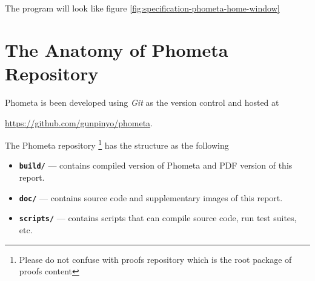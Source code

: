 \documentclass[master.tex]{subfiles}
\begin{document}
The program will look like figure \ref{fig:specification-phometa-home-window}

\section{The Anatomy of Phometa Repository}

Phometa is been developed using \emph{Git} as the version control and hosted
at

\url{https://github.com/gunpinyo/phometa}.

The Phometa repository \footnote{Please do not confuse with proofs repository
  which is the root package of proofs content} has the structure as the
following

\begin{itemize}
\item \texttt{\textbf{build/}} --- contains compiled version of Phometa and PDF
  version of this report.

\item \texttt{\textbf{doc/}} --- contains source code and supplementary images
  of this report.

\item \texttt{\textbf{scripts/}} --- contains scripts that can compile source
  code, run test suites, etc.


\end{itemize}
\end{document}
